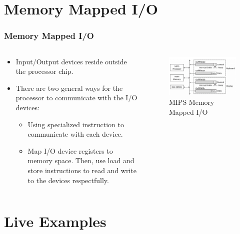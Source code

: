 \documentclass[
	11pt, %
]{beamer}
\begin{document}
\section{Memory Mapped I/O}
\begin{frame}
	\frametitle{Memory Mapped I/O}
	\begin{columns}[c]
		\begin{column}{0.5\textwidth}
			\begin{itemize}
				\item Input/Output devices reside outside the processor chip. \pause
				\item There are two general ways for the processor to communicate with the I/O devices:
				\begin{itemize}
					\item Using specialized instruction to communicate with each device. \pause
					\item Map I/O device registers to memory space. Then, use load and store instructions to read and write to the devices respectfully. \pause
				\end{itemize}
			\end{itemize}
		\end{column}
		\begin{column}{0.5\textwidth}
			\begin{figure}
				\includegraphics[width=\linewidth]{mmio.png}
				\caption{MIPS Memory Mapped I/O}
			\end{figure}
		\end{column}
	\end{columns}
\end{frame}


\section{Live Examples}
\end{document}
